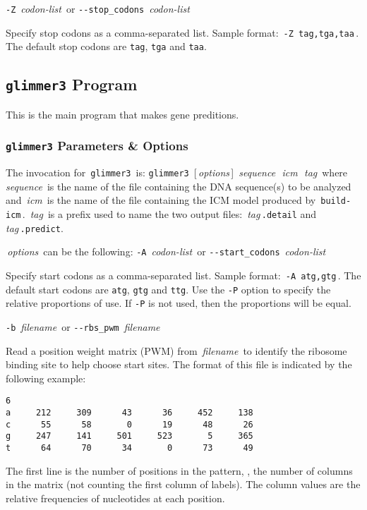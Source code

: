 \documentclass[fleqn,titlepage,11pt]{article}
\def\Desc#1{\,\mbox{\emph{#1}}\,}
\def\Pg#1{\texttt{#1}}
\begin{document}
\exdent
  \verb`-Z` \Desc{codon-list} \enskip or \enskip \verb`--stop_codons` \Desc{codon-list}

  Specify stop codons as a comma-separated list.
  Sample format:  \,\verb`-Z tag,tga,taa`\,.
  The default stop codons are \Pg{tag}, \Pg{tga} and \Pg{taa}.
\el

\subsection{\Pg{glimmer3} Program}

This is the main program that makes gene preditions.

\subsubsection{\Pg{glimmer3} Parameters \& Options}
The invocation for \,\Pg{glimmer3}\, is:
\bq
  \Pg{glimmer3}\, [\Desc{options}] \Desc{sequence} \Desc{icm} \Desc{tag}
\eq
where \Desc{sequence} is the name of the file containing the DNA
sequence(s) to be analyzed and \Desc{icm} is the name of the file
containing the ICM model produced by \,\verb`build-icm`\,.  \Desc{tag}
is a prefix used to name the two output files:  \Desc{tag}\verb`.detail`
and \Desc{tag}\verb`.predict`.

\Desc{options} can be the following:
\bl{}\RaggedRight
\exdent
  \verb`-A` \Desc{codon-list} \enskip or \enskip \verb`--start_codons` \Desc{codon-list}

  Specify start codons as a comma-separated list.
  Sample format:  \,\verb`-A atg,gtg`\,.
  The default start codons are \Pg{atg}, \Pg{gtg} and \Pg{ttg}.
  Use the \Pg{-P} option to specify the relative proportions of use.
  If \Pg{-P} is not used, then the proportions will be equal.

\exdent
  \verb`-b` \Desc{filename} \enskip or \enskip \verb`--rbs_pwm` \Desc{filename}

  Read a position weight matrix (PWM) from \Desc{filename} to identify
  the ribosome binding site to help choose start sites.  The format of
  this file is indicated by the following example:
\BSV\begin{verbatim}
6
a     212     309      43      36     452     138
c      55      58       0      19      48      26
g     247     141     501     523       5     365
t      64      70      34       0      73      49
\end{verbatim}\ESV
  The first line is the number of positions in the pattern, \ie,
  the number of columns in the matrix (not counting
  the first column of labels).  The column values are the relative
  frequencies of nucleotides at each position.
\end{document}
